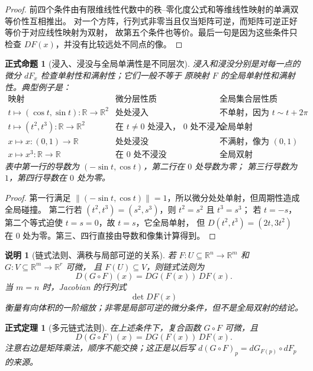 \documentclass[UTF8,fontset=none,a4paper,11pt]{ctexart}
\theoremstyle{foundation-definition}
\theoremstyle{foundation-theorem}
\newtheorem{theorem}[definition]{正式定理}
\theoremstyle{foundation-proposition}
\newtheorem{proposition}[definition]{正式命题}
\theoremstyle{foundation-example}
\theoremstyle{foundation-remark}
\newtheorem{remark}[definition]{说明}
\theoremstyle{foundation-theorem}
\begin{document}
\begin{proof}
前四个条件由有限维线性代数中的秩--零化度公式和等维线性映射的单满双等价性互相推出。
对一个方阵，行列式非零当且仅当矩阵可逆，而矩阵可逆正好等价于对应线性映射为双射，
故第五个条件也等价。最后一句是因为这些条件只检查 \(DF(x)\)，并没有比较远处不同点的像。
\end{proof}

\begin{proposition}[浸入、浸没与全局单满性是不同层次]\label{prop:immersion-submersion-global-separation}
浸入和浸没分别是对每一点的微分 \(dF_x\) 检查单射性和满射性；它们一般不等于
原映射 \(F\) 的全局单射性和满射性。典型例子是：
\[
\begin{array}{c|c|c}
\text{映射}&\text{微分层性质}&\text{全局集合层性质}\\
\hline
t\mapsto(\cos t,\sin t):\mathbb R\to\mathbb R^2&
\text{处处浸入}&\text{不单射，因为 }t\sim t+2\pi\\
t\mapsto(t^2,t^3):\mathbb R\to\mathbb R^2&
\text{在 }t\ne0\text{ 处浸入， }0\text{ 处不浸入}&\text{全局单射}\\
x\mapsto x:(0,1)\to\mathbb R&
\text{处处浸没}&\text{不满射，像为 }(0,1)\\
x\mapsto x^3:\mathbb R\to\mathbb R&
\text{在 }0\text{ 处不浸没}&\text{全局双射}
\end{array}
\]
表中第一行的导数为 \((-\sin t,\cos t)\)，第二行在 \(0\) 处导数为零；
第三行导数为 \(1\)，第四行导数在 \(0\) 处为零。
\end{proposition}

\begin{proof}
第一行满足 \(\|(-\sin t,\cos t)\|=1\)，所以微分处处单射，但周期性造成全局碰撞。
第二行若 \((t^2,t^3)=(s^2,s^3)\)，则 \(t^2=s^2\) 且 \(t^3=s^3\)；
若 \(t=-s\)，第二个等式迫使 \(t=s=0\)，故 \(t=s\)，它全局单射，
但 \(D(t^2,t^3)=(2t,3t^2)\) 在 \(0\) 处为零。第三、四行直接由导数和像集计算得到。
\end{proof}

\begin{remark}[链式法则、满秩与局部可逆的关系]
若 \(F:U\subseteq\mathbb R^n\to\mathbb R^m\) 和 \(G:V\subseteq\mathbb R^m\to\mathbb R^r\) 可微，
且 \(F(U)\subseteq V\)，则链式法则为
\[
D(G\circ F)(x)=DG(F(x))\,DF(x).
\]
当 \(m=n\) 时，Jacobian 的行列式
\[
\det DF(x)
\]
衡量有向体积的一阶缩放；非零是局部可逆的微分条件，但不是全局双射的结论。
\end{remark}

\begin{theorem}[多元链式法则]
在上述条件下，复合函数 \(G\circ F\) 可微，且
\[
D(G\circ F)(x)=DG(F(x))\,DF(x).
\]
注意右边是矩阵乘法，顺序不能交换；这正是以后写 \(d(G\circ F)_p=dG_{F(p)}\circ dF_p\) 的来源。
\end{theorem}
\end{document}
